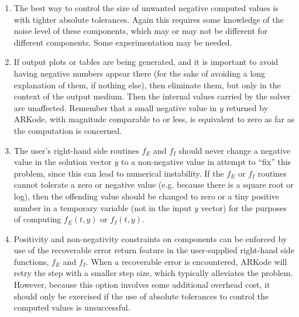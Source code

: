 \documentclass[letterpaper,10pt,english]{sphinxmanual}
\begin{document}
\begin{enumerate}
\item {} 
The best way to control the size of unwanted negative computed
values is with tighter absolute tolerances.  Again this requires
some knowledge of the noise level of these components, which may
or may not be different for different components. Some
experimentation may be needed.

\item {} 
If output plots or tables are being generated, and it is important
to avoid having negative numbers appear there (for the sake of
avoiding a long explanation of them, if nothing else), then
eliminate them, but only in the context of the output medium. Then
the internal values carried by the solver are unaffected. Remember
that a small negative value in $y$ returned by ARKode, with
magnitude comparable to  or less, is equivalent to zero
as far as the computation is concerned.

\item {} 
The user's right-hand side routines $f_E$ and $f_I$
should never change a negative value in the solution vector $y$
to a non-negative value in attempt to ``fix'' this problem,
since this can lead to numerical instability.  If the $f_E$
or $f_I$ routines cannot tolerate a zero or negative value
(e.g. because there is a square root or log), then the offending
value should be changed to zero or a tiny positive number in a
temporary variable (not in the input $y$ vector) for the
purposes of computing $f_E(t, y)$ or $f_I(t, y)$.

\item {} 
Positivity and non-negativity constraints on components can be
enforced by use of the recoverable error return feature in the
user-supplied right-hand side functions, $f_E$ and
$f_I$. When a recoverable error is encountered, ARKode will
retry the step with a smaller step size, which typically
alleviates the problem.  However, because this option involves
some additional overhead cost, it should only be exercised if the
use of absolute tolerances to control the computed values is
unsuccessful.

\end{enumerate}
\end{document}
